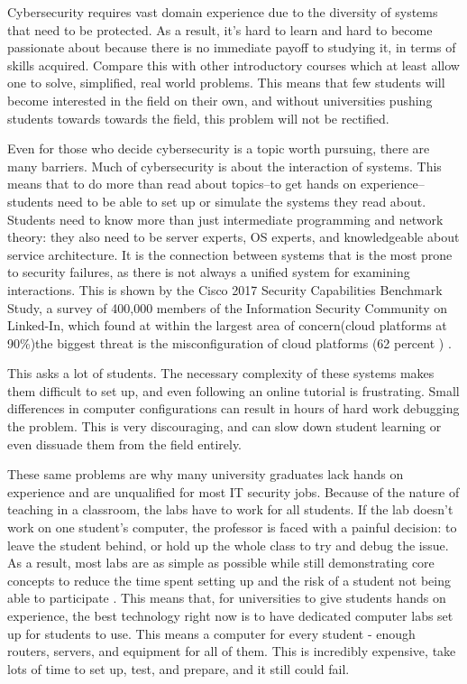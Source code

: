 \documentclass[openright]{report}
\begin{document}
\par Cybersecurity requires vast domain experience due to the diversity of systems that need to be protected. As a result, it's hard to learn and hard to become passionate about because there is no immediate payoff to studying it, in terms of skills acquired. Compare this with other introductory courses which at least allow one to solve, simplified, real world problems. This means that few students will become interested in the field on their own, and without universities pushing students towards towards the field, this problem will not be rectified.

\par Even for those who decide cybersecurity is a topic worth pursuing, there are many barriers. Much of cybersecurity is about the interaction of systems. This means that to do more than read about topics--to get hands on experience--students need to be able to set up or simulate the systems they read about. Students need to know more than just intermediate programming and network theory: they also need to be server experts, OS experts, and knowledgeable about service architecture. It is the connection between systems that is the most prone to security failures, as there is not always a unified system for examining interactions. This is shown by the Cisco 2017 Security Capabilities Benchmark Study, a survey of 400,000 members of the Information Security Community on Linked-In, which found at within the largest area of concern(cloud platforms at 90\%)the biggest threat is the misconfiguration of cloud platforms (62 percent ) \cite{Cisco}.

\par This asks a lot of students. The necessary complexity of these systems makes them difficult to set up, and even following an online tutorial is frustrating. Small differences in computer configurations can result in hours of hard work debugging the problem. This is very discouraging, and can slow down student learning or even dissuade them from the field entirely. 

\par These same problems are why many university graduates lack hands on experience and are unqualified for most IT security jobs. Because of the nature of teaching in a classroom, the labs have to work for all students. If the lab doesn't work on one student's computer, the professor is faced with a painful decision: to leave the student behind, or hold up the whole class to try and debug the issue. As a result, most labs are as simple as possible while still demonstrating core concepts to reduce the time spent setting up and the risk of a student not being able to participate \cite{ibrahiminterview}. This means that, for universities to give students hands on experience, the best technology right now is to have dedicated computer labs set up for students to use. This means a computer for every student - enough routers, servers, and equipment for all of them. This is incredibly expensive, take lots of time to set up, test, and prepare, and it still could fail.
\end{document}
